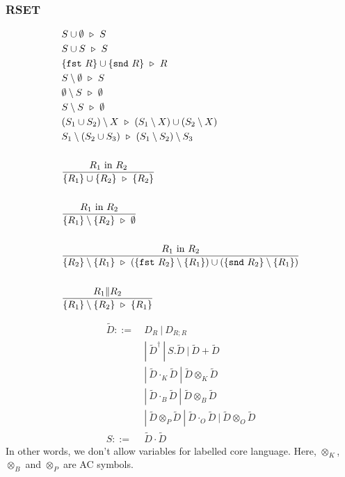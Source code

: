 \subsubsection*{\textsf{RSET}}
\begin{align*}
  & S \cup \emptyset \ \triangleright\  S \\
  & S \cup S \ \triangleright\  S \\
  & \{ \texttt{fst}\ R \} \cup \{ \texttt{snd}\ R \} \ \triangleright\  R \\
  & S \setminus \emptyset \ \triangleright\  S \\
  & \emptyset \setminus S \ \triangleright\  \emptyset \\
  & S \setminus S \ \triangleright\  \emptyset \\
  & (S_1 \cup S_2) \setminus X \ \triangleright\  (S_1 \setminus X) \cup (S_2 \setminus X) \\
  & S_1 \setminus (S_2 \cup S_3) \ \triangleright\  (S_1 \setminus S_2) \setminus S_3 \\
  \\
  & \frac{ R_1 \textrm{ in } R_2 }{ \{ R_1 \} \cup \{ R_2 \} \ \triangleright\  \{ R_2 \} } \\
  \\
  & \frac{ R_1 \textrm{ in } R_2 }{ \{ R_1 \} \setminus \{ R_2 \} \ \triangleright\  \emptyset } \\
  \\
  & \frac{ R_1 \textrm{ in } R_2 }{ \{R_2\} \setminus \{R_1\} \ \triangleright\  (\{\texttt{fst}\ R_2\} \setminus \{R_1\}) \cup (\{\texttt{snd}\ R_2\} \setminus \{R_1\})} \\
  \\
  & \frac{R_1 \| R_2}{ \{ R_1 \} \setminus \{ R_2 \} \ \triangleright\  \{ R_1 \}} 
\end{align*}

\begin{definition}
  \begin{align*}
    \tilde{D} ::=\ & D_{R}\ |\ D_{R; R}\\
    & |\ \tilde{D}^\dagger\ |\ S.\tilde{D}\ |\ \tilde{D} + \tilde{D} \\
    & |\ \tilde{D} \cdot_K \tilde{D}\ |\ \tilde{D} \otimes_K \tilde{D}\\
    & |\ \tilde{D} \cdot_B \tilde{D}\ |\ \tilde{D} \otimes_B \tilde{D}\\
    & |\ \tilde{D} \otimes_P \tilde{D}\ |\ \tilde{D} \cdot_O \tilde{D}\ |\ \tilde{D} \otimes_O \tilde{D} \\
    S ::=\ & \tilde{D} \cdot \tilde{D}
  \end{align*}
  In other words, we don't allow variables for labelled core language.
  Here, $\otimes_K$, $\otimes_B$ and $\otimes_P$ are AC symbols.
\end{definition}

